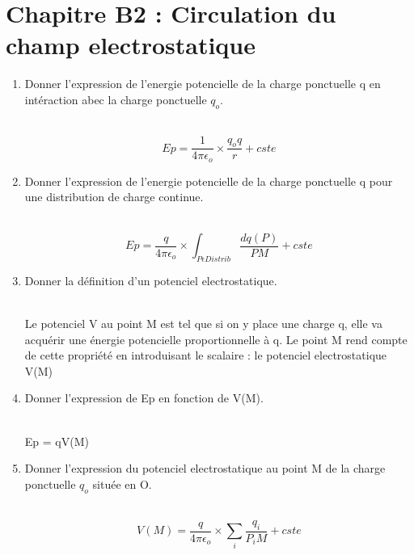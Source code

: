 \section*{\centering Chapitre B2 : Circulation du champ electrostatique}
\begin{enumerate}[label=\arabic{enumi} - , left=0pt, itemsep=1em] %

    \item Donner l'expression de l'energie potencielle de la charge ponctuelle q en intéraction abec la charge ponctuelle $q_o$. \par
    \begin{solution} \\
        \[ Ep = \frac{1}{4 \pi \epsilon_o} \times \frac{q_o q}{r} + cste\]
    \end{solution}

    \item Donner l'expression de l'energie potencielle de la charge ponctuelle q pour une distribution de charge continue. \par
    \begin{solution} \\
        \[ Ep = \frac{q}{4 \pi \epsilon_o} \times \int_{P \epsilon Distrib} \frac{dq(P)}{PM} + cste\]
    \end{solution}

    \item Donner la définition d'un potenciel electrostatique. \par
    \begin{solution} \\
        Le potenciel V au point M est tel que si on y place une charge q, elle va acquérir une énergie potencielle proportionnelle à q.
        Le point M rend compte de cette propriété en introduisant le scalaire : le potenciel electrostatique V(M)
    \end{solution}


    \item Donner l'expression de Ep en fonction de V(M). \par
    \begin{solution} \\
        Ep = qV(M)
    \end{solution}

    \item Donner l'expression du potenciel electrostatique au point M de la charge ponctuelle $q_o$ située en O.\par
    \begin{solution} \\
        \[ V(M) = \frac{q}{4 \pi \epsilon_o} \times \sum_i \frac{q_i}{P_iM} + cste\]
    \end{solution}


\end{enumerate}
